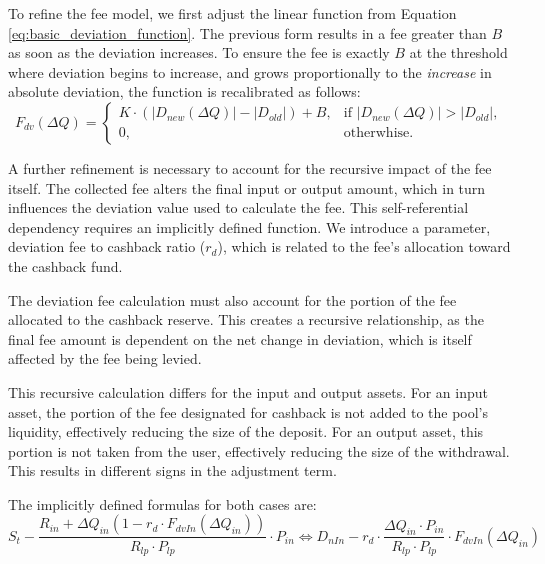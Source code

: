 To refine the fee model, we first adjust the linear function from Equation \ref{eq:basic_deviation_function}. The previous form results in a fee greater than $B$ as soon as the deviation increases. To ensure the fee is exactly $B$ at the threshold where deviation begins to increase, and grows proportionally to the \textit{increase} in absolute deviation, the function is recalibrated as follows:
\begin{equation}
	\label{eq:general_deviation_function}
	F_{dv}(\Delta Q) = \begin{cases} 
		K \cdot (\lvert D_{new}(\Delta Q) \rvert - \lvert D_{old} \rvert) + B, & \text{if } \lvert D_{new}(\Delta Q) \rvert > \lvert D_{old} \rvert, \\
		0, & \text{otherwhise.} 
	\end{cases}	
\end{equation}

A further refinement is necessary to account for the recursive impact of the fee itself. The collected fee alters the final input or output amount, which in turn influences the deviation value used to calculate the fee. This self-referential dependency requires an implicitly defined function. We introduce a parameter, deviation fee to cashback ratio ($r_d$), which is related to the fee's allocation toward the cashback fund.

The deviation fee calculation must also account for the portion of the fee allocated to the cashback reserve. This creates a recursive relationship, as the final fee amount is dependent on the net change in deviation, which is itself affected by the fee being levied. 

This recursive calculation differs for the input and output assets. For an input asset, the portion of the fee designated for cashback is not added to the pool's liquidity, effectively reducing the size of the deposit. For an output asset, this portion is not taken from the user, effectively reducing the size of the withdrawal. This results in different signs in the adjustment term.

The implicitly defined formulas for both cases are:
\begin{equation}
	\label{eq:deviation_in_to_cashback_explanation}
	S_t - \frac{R_{in} + \Delta Q_{in} (1 - r_d \cdot F_{dvIn}(\Delta Q_{in}))}{R_{lp} \cdot P_{lp}}  \cdot P_{in} \iff D_{nIn} - r_{d} \cdot \frac{\Delta Q_{in} \cdot P_{in} }{R_{lp} \cdot P_{lp}} \cdot F_{dvIn}(\Delta Q_{in})
\end{equation}

